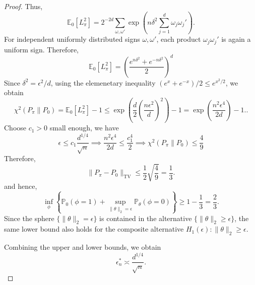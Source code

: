 \begin{proof}
Thus,
\[
\mathbb E_0[L_\pi^2]
=
2^{-2d}
\sum_{\omega,\omega'}
\exp\left(
n\delta^2 \sum_{j=1}^d \omega_j\omega_j'
\right).
\]
For independent uniformly distributed signs $\omega,\omega'$, each product
$\omega_j\omega_j'$ is again a uniform sign. Therefore,
\[
\mathbb E_0[L_\pi^2]
=
\left(
\frac{e^{n\delta^2}+e^{-n\delta^2}}2
\right)^d
\]
Since $\delta^2=\epsilon^2/d$, using the elemenetary inequality $(e^x + e^{-x})/2 \le e^{x^2/2}$, we obtain
\[
\chi^2(P_\pi\|P_0)
=
\mathbb E_0[L_\pi^2]-1
\le
\exp\left(
\frac d2\left(\frac{n\epsilon^2}{d}\right)^2
\right)-1
=
\exp\left(
\frac{n^2\epsilon^4}{2d}
\right)-1..
\]
Choose $c_1>0$ small enough, we have
\[
\epsilon
\le
c_1\frac{d^{1/4}}{\sqrt n} \implies \frac{n^2\epsilon^4}{2d}
\le
\frac{c_1^4}{2}\implies \chi^2(P_\pi\|P_0)\le \frac49
\]
Therefore,
\[
\|P_\pi-P_0\|_{\mathrm{TV}}
\le
\frac12\sqrt{\frac49}
=
\frac13.
\]
and hence,
\[
\inf_\phi
\left\{
\mathbb P_0(\phi=1)
+
\sup_{\|\theta\|_2=\epsilon}\mathbb P_\theta(\phi=0)
\right\}
\ge
1-\frac13
=
\frac23.
\]
Since the sphere $\{\|\theta\|_2=\epsilon\}$ is contained in the alternative
$\{\|\theta\|_2\ge \epsilon\}$, the same lower bound also holds for the composite alternative
$H_1(\epsilon):\|\theta\|_2\ge \epsilon$.

Combining the upper and lower bounds, we obtain
\[
\epsilon_n^*\asymp \frac{d^{1/4}}{\sqrt n}.
\]
\end{proof}




